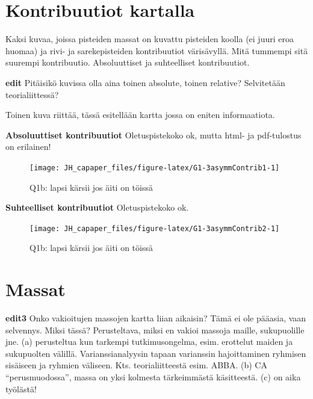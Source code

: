 \documentclass[
  finnish,
]{book}
\begin{document}
\hypertarget{kontribuutiot-kartalla}{%
\section{Kontribuutiot kartalla}\label{kontribuutiot-kartalla}}

Kaksi kuvaa, joissa pisteiden massat on kuvattu pisteiden koolla (ei
juuri eroa huomaa) ja rivi- ja sarekepisteiden kontribuutiot
värisävyllä. Mitä tummempi sitä suurempi kontribuutio. Absoluuttiset ja
suhteelliset kontribuutiot.

\textbf{edit} Pitäisikö kuvissa olla aina toinen absolute, toinen
relative? Selvitetään teorialiittessä?

Toinen kuva riittää, tässä esitellään kartta jossa on eniten
informaatiota.

\textbf{Absoluuttiset kontribuutiot} Oletuspistekoko ok, mutta html- ja
pdf-tulostus on erilainen!

\begin{figure}

{\centering \texttt{[image: JH\_capaper\_files/figure-latex/G1-3asymmContrib1-1]} 

}

\caption{Q1b: lapsi kärsii jos äiti on töissä}\label{fig:G1-3asymmContrib1}
\end{figure}

\textbf{Suhteelliset kontribuutiot} Oletuspistekoko ok.

\begin{figure}

{\centering \texttt{[image: JH\_capaper\_files/figure-latex/G1-3asymmContrib2-1]} 

}

\caption{Q1b: lapsi kärsii jos äiti on töissä}\label{fig:G1-3asymmContrib2}
\end{figure}

\hypertarget{massat}{%
\section{Massat}\label{massat}}

\textbf{edit3} Onko vakioitujen massojen kartta liian aikaisin? Tämä ei
ole pääasia, vaan selvennys. Miksi tässä? Perusteltava, miksi en vakioi
massoja maille, sukupuolille jne. (a) perusteltua kun tarkempi
tutkimusongelma, esim. erottelut maiden ja sukupuolten välillä.
Varianssianalyysin tapaan varianssin hajoittaminen ryhmisen sisäiseen ja
ryhmien väliseen. Kts. teorialiitteestä esim. ABBA. (b) CA
``perusmuodossa'', massa on yksi kolmesta tärkeimmästä käsitteestä. (c)
on aika työlästä!
\end{document}
